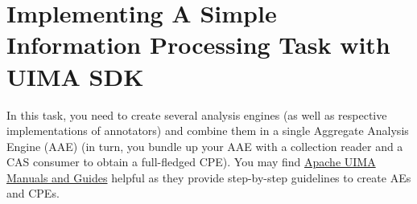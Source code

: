 
\chapter{Implementing A Simple Information Processing Task with UIMA SDK}

In this task, you need to 
create several analysis engines (as well as
respective implementations of annotators) 
and combine them in a single Aggregate Analysis Engine (AAE)
(in turn, you bundle up your AAE with a collection reader and 
a CAS consumer to obtain a full-fledged CPE).
You may find \href{http://uima.apache.org/documentation.html#manuals_and_guides}{Apache UIMA Manuals and
Guides}
helpful as they provide step-by-step guidelines to create AEs and CPEs.






